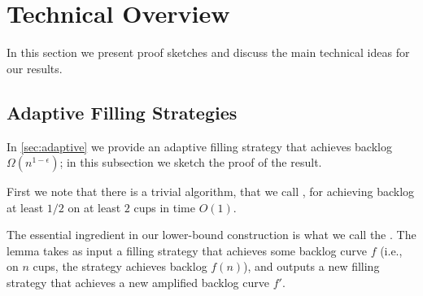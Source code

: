 \section{Technical Overview}
\label{sec:technical_overview}

In this section we present proof sketches and discuss the main technical ideas for our results. 

\subsection{Adaptive Filling Strategies}\label{sec:technicaladaptive}
In \cref{sec:adaptive} we provide an adaptive filling strategy that achieves
backlog $\Omega(n^{1 - \epsilon})$; in this subsection we sketch the
proof of the result.

First we note that there is a trivial algorithm, that we call
, for achieving backlog at least $1/2$ on at
least $2$ cups in time $O(1)$.

The essential ingredient in our lower-bound construction is what we
call the . The lemma takes as input a
filling strategy that achieves some backlog curve $f$ (i.e., on $n$
cups, the strategy achieves backlog $f(n)$), and outputs a new filling
strategy that achieves a new amplified backlog curve $f'$.

